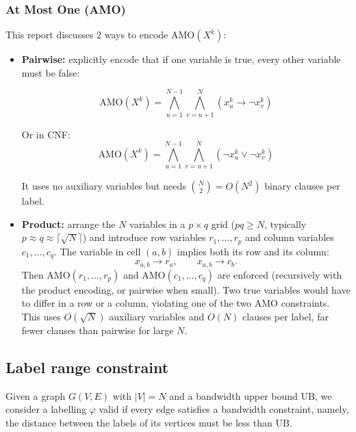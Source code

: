 \documentclass[a4paper,fleqn]{cas-sc}
\begin{document}
        \subsubsection{At Most One (AMO)}
            \noindent This report discusses 2 ways to encode $\text{AMO}(X^k)$:
            \begin{itemize}
                \item \textbf{Pairwise:} explicitly encode that if one variable is true, every other variable must be false:
                
                \begin{equation}
                    \text{AMO}(X^k) = \bigwedge_{u=1}^{N-1}
                    \bigwedge_{v=u+1}^{N}
                    \left(x_u^k \rightarrow \neg x_v^k\right)
                \end{equation}

                Or in CNF:
                \begin{equation}
                    \text{AMO}(X^k) = \bigwedge_{u=1}^{N-1}
                    \bigwedge_{v=u+1}^{N}
                    \left(\neg x_u^k \vee \neg x_v^k\right)
                \end{equation}

                It uses no auxiliary variables but needs $\binom{N}{2} = O(N^2)$ binary clauses per label.

                \item \textbf{Product:} arrange the $N$ variables in a $p \times q$ grid ($pq \ge N$, typically $p \approx q \approx \lceil\sqrt{N}\rceil$) and introduce row variables $r_1,\dots,r_p$ and column variables $c_1,\dots,c_q$. The variable in cell $(a,b)$ implies both its row and its column:
                    \begin{equation}
                        x_{a,b} \rightarrow r_a, \qquad x_{a,b} \rightarrow c_b.
                    \end{equation}
                    Then $\text{AMO}(r_1,\dots,r_p)$ and $\text{AMO}(c_1,\dots,c_q)$ are enforced (recursively with the product encoding, or pairwise when small). Two true variables would have to differ in a row or a column, violating one of the two AMO constraints. This uses $O(\sqrt{N})$ auxiliary variables and $O(N)$ clauses per label, far fewer clauses than pairwise for large $N$.
            \end{itemize}


    \subsection{Label range constraint}
        Given a graph $G(V,E)$ with $|V|=N$ and a bandwidth upper bound $\text{UB}$, we consider a labelling $\varphi$ valid if every edge satisfies a bandwidth constraint, namely, the distance between the labels of its vertices must be less than $\text{UB}$.
        
\end{document}
